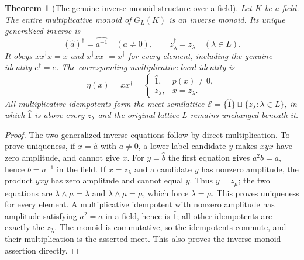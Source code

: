\documentclass[11pt]{article}
\newtheorem{theorem}{Theorem}
\begin{document}
\begin{theorem}[The genuine inverse-monoid structure over a field]
\label{sh:inversemonoid}
Let $K$ be a field. The entire multiplicative monoid of $G_L(K)$
is an inverse monoid. Its unique generalized inverse is
\begin{equation}\tag{SH6a}\label{sh:generalizedinverse}
 (\widehat a)^\dagger=\widehat{a^{-1}}\quad(a\ne0),\qquad
 z_\lambda^\dagger=z_\lambda\quad(\lambda\in L).
\end{equation}
It obeys $xx^\dagger x=x$ and
$x^\dagger xx^\dagger=x^\dagger$ for every element,
including the genuine identity $e^\dagger=e$.
The corresponding multiplicative local identity is
\begin{equation}\tag{SH6b}\label{sh:rangeidempotent}
 \eta(x)=xx^\dagger=
 \begin{cases}
 \widehat1,&p(x)\ne0,\\
 z_\lambda,&x=z_\lambda.
 \end{cases}
\end{equation}
All multiplicative idempotents form the meet-semilattice
$\mathcal E=\{\widehat1\}\sqcup\{z_\lambda:\lambda\in L\}$,
in which $\widehat1$ is above every $z_\lambda$ and the
original lattice $L$ remains unchanged beneath it.
\end{theorem}
\begin{proof}
The two generalized-inverse equations follow by direct
multiplication. To prove uniqueness, if $x=\widehat a$ with
$a\ne0$, a lower-label candidate $y$ makes $xyx$ have zero
amplitude, and cannot give $x$. For $y=\widehat b$ the first
equation gives $a^2b=a$, hence $b=a^{-1}$ in the field.
If $x=z_\lambda$ and a candidate $y$ has nonzero amplitude,
the product $yxy$ has zero amplitude and cannot equal $y$.
Thus $y=z_\mu$; the two equations are
$\lambda\wedge\mu=\lambda$ and
$\lambda\wedge\mu=\mu$, which force $\lambda=\mu$.
This proves uniqueness for every element. A multiplicative
idempotent with nonzero amplitude has amplitude satisfying
$a^2=a$ in a field, hence is $\widehat1$; all other
idempotents are exactly the $z_\lambda$.
The monoid is commutative, so the idempotents commute, and
their multiplication is the asserted meet. This also proves
the inverse-monoid assertion directly.
\end{proof}
\end{document}
